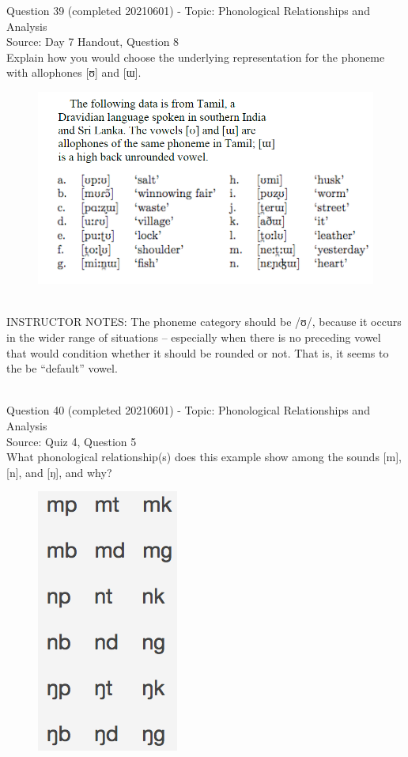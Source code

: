 \documentclass[12pt]{article}
\begin{document}
{\large Question 39} (completed 20210601) - Topic: Phonological Relationships and Analysis\\
Source: Day 7 Handout, Question 8\\

Explain how you would choose the underlying representation for the phoneme with allophones [ʊ] and [ɯ].\\

\begin{figure}[H]
\includegraphics{../images/tamil.png}
\end{figure}

~\\
INSTRUCTOR NOTES: The phoneme category should be /ʊ/, because it occurs in the wider range of situations – especially when there is no preceding vowel that would condition whether it should be rounded or not. That is, it seems to the be “default” vowel.


~\\

{\large Question 40} (completed 20210601) - Topic: Phonological Relationships and Analysis\\
Source: Quiz 4, Question 5\\

What phonological relationship(s) does this example show among the sounds [m], [n], and [ŋ], and why?\\

\begin{figure}[H]
\includegraphics{../images/quiz4question5_a.png}
\end{figure}
\end{document}
